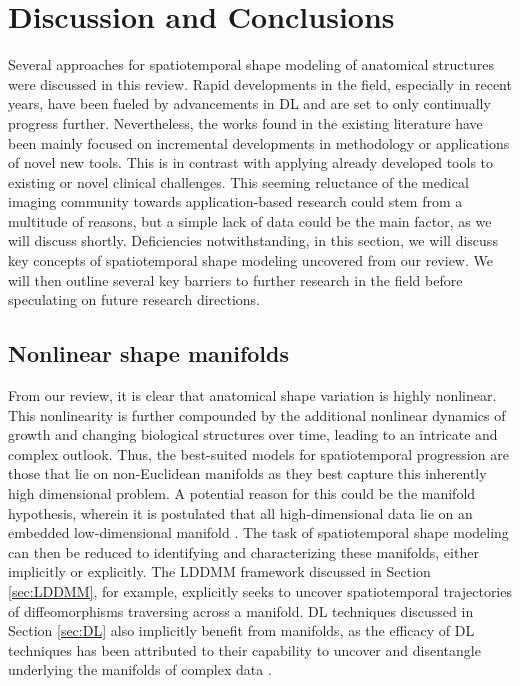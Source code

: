 \section{Discussion and Conclusions}

	Several approaches for spatiotemporal shape modeling of anatomical structures were discussed in this review. Rapid developments in the field, especially in recent years, have been fueled by advancements in DL and are set to only continually progress further. Nevertheless, the works found in the existing literature have been mainly focused on incremental developments in methodology or applications of novel new tools. This is in contrast with applying already developed tools to existing or novel clinical challenges. This seeming reluctance of the medical imaging community towards application-based research could stem from a multitude of reasons, but a simple lack of data could be the main factor, as we will discuss shortly. Deficiencies notwithstanding, in this section, we will discuss key concepts of spatiotemporal shape modeling uncovered from our review. We will then outline several key barriers to further research in the field before speculating on future research directions. 
	
	\subsection{Nonlinear shape manifolds} 

		From our review, it is clear that anatomical shape variation is highly nonlinear. This nonlinearity is further compounded by the additional nonlinear dynamics of growth and changing biological structures over time, leading to an intricate and complex outlook. Thus, the best-suited models for spatiotemporal progression are those that lie on non-Euclidean manifolds as they best capture this inherently high dimensional problem. A potential reason for this could be the manifold hypothesis, wherein it is postulated that all high-dimensional data lie on an embedded low-dimensional manifold \cite{Fefferman2016, NIPS2010_8a1e808b}. The task of spatiotemporal shape modeling can then be reduced to identifying and characterizing these manifolds, either implicitly or explicitly. The LDDMM framework discussed in Section \ref{sec:LDDMM}, for example, explicitly seeks to uncover spatiotemporal trajectories of diffeomorphisms traversing across a manifold. DL techniques discussed in Section \ref{sec:DL} also implicitly benefit from manifolds, as the efficacy of DL techniques has been attributed to their capability to uncover and disentangle underlying the manifolds of complex data \cite{Brahma2016}.    

